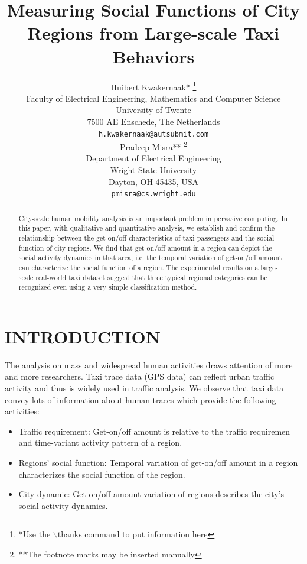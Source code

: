 \documentclass[a4paper, 10pt, conference]{ieeeconf}      %
\title{\LARGE \bf
Measuring Social Functions of City Regions from Large-scale Taxi Behaviors
}
\author{ \parbox{3 in}{\centering Huibert Kwakernaak*
         \thanks{*Use the $\backslash$thanks command to put information here}\\
         Faculty of Electrical Engineering, Mathematics and Computer Science\\
         University of Twente\\
         7500 AE Enschede, The Netherlands\\
         {\tt\small h.kwakernaak@autsubmit.com}}
         \hspace*{ 0.5 in}
         \parbox{3 in}{ \centering Pradeep Misra**
         \thanks{**The footnote marks may be inserted manually}\\
        Department of Electrical Engineering \\
         Wright State University\\
         Dayton, OH 45435, USA\\
         {\tt\small pmisra@cs.wright.edu}}
}
\begin{document}
\maketitle
\thispagestyle{empty}
\pagestyle{empty}

\begin{abstract}

City-scale human mobility analysis is an important problem in pervasive computing. In this paper, with qualitative and quantitative analysis, we establish and confirm the relationship between the get-on/off characteristics of taxi passengers and the social function of city regions. We find that get-on/off amount in a region can depict the social activity dynamics in that area, i.e. the temporal variation of get-on/off amount can characterize the social function of a region. The experimental results on a large-scale real-world taxi dataset suggest that three typical regional categories can be recognized even using a very simple classification method.

\end{abstract}

\section{INTRODUCTION}%

The analysis on mass and widespread human activities draws attention of more and more researchers. Taxi trace data (GPS data) can reflect urban traffic activity and thus is widely used in traffic analysis. We observe that taxi data convey lots of information about human traces which provide the following activities:

\begin{itemize}

\item Traffic requirement: Get-on/off amount is relative to the traffic requiremen and time-variant activity pattern of a region.
\item Regions’ social function: Temporal variation of get-on/off amount in a region characterizes the social function of the region.
\item City dynamic: Get-on/off amount variation of regions describes the city’s social activity dynamics.

\end{itemize}
\end{document}
